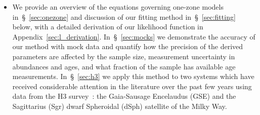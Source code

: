 \documentclass[ms.tex]{subfiles}
\begin{document}
\begin{itemize}
	\item We provide an overview of the equations governing one-zone models
	in~\S~\ref{sec:onezone} and discussion of our fitting method
	in~\S~\ref{sec:fitting} below, with a detailed derivation of our
	likelihood function in Appendix~\ref{sec:l_derivation}.
	In~\S~\ref{sec:mocks} we demonstrate the accuracy of our method with mock
	data and quantify how the precision of the derived parameters are affected
	by the sample size, measurement uncertainty in abundances and ages, and
	what fraction of the sample has available age measurements.
	In~\S~\ref{sec:h3} we apply this method to two systems which have received
	considerable attention in the literature over the past few years using data
	from the H3 survey~\citep{Conroy2019}: the Gaia-Sausage Encelaudus (GSE)
	and the Sagittarius (Sgr) dwarf Spheroidal (dSph) satellite of the Milky
	Way.

\end{itemize}
\end{document}
